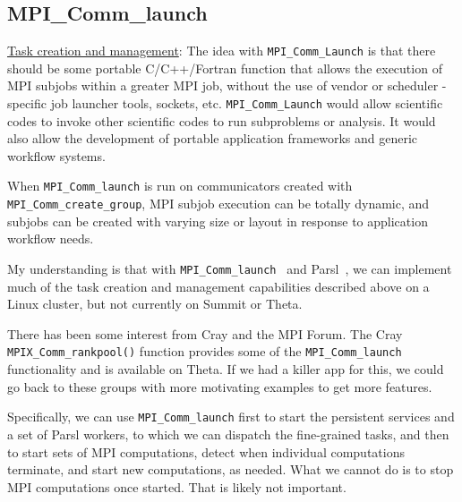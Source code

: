 \documentclass[10pt]{article}
\newcommand\yadu[1]{{\color{red}[Yadu: #1]}}
\begin{document}
\subsection{MPI\_Comm\_launch}

\underline{Task creation and management}: 
The idea with \texttt{MPI\_Comm\_Launch} is that there should be some portable C/C++/Fortran
function that allows the execution of MPI subjobs within a greater MPI job, without the use of 
vendor or scheduler -specific job launcher tools, sockets, etc.  \texttt{MPI\_Comm\_Launch} 
would allow scientific codes to invoke other scientific codes to run subproblems or analysis.  It 
would also allow the development of portable application frameworks and generic workflow systems.

When \texttt{MPI\_Comm\_launch} is run on communicators created with \texttt{MPI\_Comm\_create\_group},
MPI subjob execution can be totally dynamic, and subjobs can be created with varying size or layout in 
response to application workflow needs.

My understanding is that with \texttt{MPI\_Comm\_launch}~\cite{wozniak2019mpi} and Parsl~\cite{babuji19parsl}, 
we can implement much of the task creation and management capabilities described above on a Linux cluster, but not currently on Summit or Theta.  

There has been some interest from Cray and the MPI Forum.  The Cray \texttt{MPIX\_Comm\_rankpool()} function provides some of the \texttt{MPI\_Comm\_launch} functionality and is available on Theta.  If we had a killer app for this, we could go back to these groups with more motivating examples to get more features.

Specifically, we can use \texttt{MPI\_Comm\_launch} first to start the persistent services and a set of Parsl workers, to which we can dispatch the fine-grained tasks,
and then to start sets of MPI computations, detect when individual computations terminate, and start new computations, as needed.
What we cannot do is to stop MPI computations once started. That is likely not important.

\end{document}
